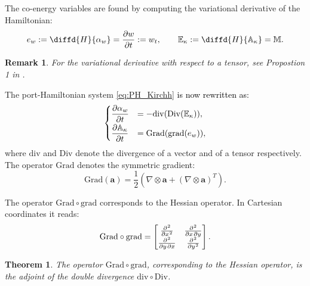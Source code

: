 \documentclass[11pt]{article}
\newtheorem{theorem}{Theorem}
\newtheorem{remark}{Remark}
\newcommand{\revOne}[1]{\textcolor{black}{#1}}
\begin{document}
	The co-energy variables are found by computing the variational derivative of the Hamiltonian:
	\begin{equation}
	e_w := \diffd{H}{\alpha_w} = \diffp{w}{t} := w_t,  \qquad  \mathbb{E}_{\kappa} := \diffd{H}{\mathbb{A}_{\kappa}} = \mathbb{M}.
	\end{equation}
	\begin{remark}
		For the variational derivative with respect to a tensor, see Propostion 1 in \cite{BrugnoliMin}.
	\end{remark}
	The port-Hamiltonian system \revOne{\eqref{eq:PH_Kirchh} is now rewritten as:}
	\begin{equation}
	\label{eq:PH_sys_Kir_Ten_pr}
	\begin{cases}
	\displaystyle\diffp{\alpha_w}{t} &= - \mathrm{div}(\mathrm{Div}(\mathbb{E}_{\kappa})), \vspace{1mm} \\
	\displaystyle\diffp{\mathbb{A}_{\kappa}}{t} &= \mathrm{Grad}(\mathrm{grad}(e_w)),
	\end{cases}
	\end{equation}
	where $\mathrm{div}$ and $\mathrm{Div}$ denote the divergence of a vector and of a tensor respectively. The operator $\mathrm{Grad}$ denotes the symmetric gradient:
	\begin{equation}
	\mathrm{Grad}(\bm{a}) =  \frac{1}{2} \left(\nabla \otimes \bm{a} + \left(\nabla \otimes \bm{a}\right)^T \right).
	\end{equation}
	
	The operator $\mathrm{Grad} \circ \mathrm{grad}$ corresponds to the Hessian operator. In Cartesian coordinates it reads:
	\begin{equation}
	\mathrm{Grad} \circ \mathrm{grad} = 
	\begin{bmatrix}
	\diffp[2]{}{x}  &  \diffp{}{x,y} \\
	\diffp{}{y,x}   &  \diffp[2]{}{y} \\
	\end{bmatrix}.
	\end{equation}
	
	\begin{theorem}
		The operator $\mathrm{Grad} \circ \mathrm{grad}$, corresponding to the Hessian operator, is the adjoint of the double divergence $\mathrm{div} \circ \mathrm{Div}$.
	\end{theorem}
	
\end{document}
